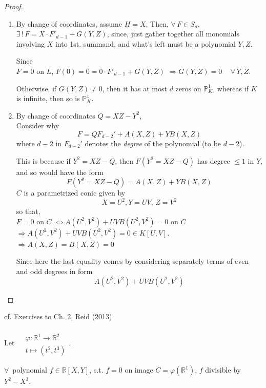 \begin{proof}
\begin{enumerate}
	\item[(i)] By change of coordinates, assume $H = X$, 
	Then, $\forall \, F \in S_d$, $\exists \, ! \, F = X \cdot F'_{d-1} + G(Y,Z)$, since, just gather together all monomials involving $X$ into 1st. summand, and what's left must be a polynomial $Y,Z$.
	
	Since \\
	$F = 0$ on $L$, $F(0) = 0 = 0 \cdot F'_{d-1} + G(Y,Z) $ $\Longrightarrow G(Y,Z) = 0\quad \, \forall \, Y,Z$. 
	
	Otherwise, if $G(Y,Z) \neq 0$, then it has at most $d$ zeros on $\mathbb{P}_K^1$, whereas if $K$ is infinite, then so is $\mathbb{P}_K^1$.  
	\item[(ii)] By change of coordinates $Q = XZ - Y^2$, \\ 
	Consider why 
	\[
	F = QF_{d-2}' + A(X,Z) + YB(X,Z)
	\]
	where $d-2$ in $F_{d-2}'$ denotes the \emph{degree} of the polynomial (to be $d-2$).
	
	This is because if $Y^2 = XZ - Q$, then $F(Y^2 = XZ - Q)$ has degree $\leq 1$ in $Y$, and so would have the form 
	\[
	F(Y^2 = XZ - Q) = A(X,Z) + YB(X,Z)
	\]
	$C$ is a parametrized conic given by 
	\[
	X = U^2 , Y = UV, \, Z = V^2
	\]
	so that, \\
	$F = 0$ on $C$ $\Longleftrightarrow  A(U^2, V^2) + UVB(U^2 , V^2) = 0$ on $C$ \\
	$\Longrightarrow A(U^2, V^2) + UVB(U^2 , V^2)  =0  \in K[U,V]$. \\
	$\Longrightarrow A(X,Z) = B(X,Z) =0 $
	
	Since here the last equality comes by considering separately terms of even and odd degrees in form 
	\[
	A(U^2, V^2)  + UVB(U^2, V^2)
	\]
	
\end{enumerate}	
\end{proof}

cf. Exercises to Ch. 2, Reid (2013)

Let $\begin{aligned} & \quad \\ 
& \varphi : \mathbb{R}^1 \to \mathbb{R}^2	\\
& t \mapsto (t^2, t^3) \end{aligned}$. 

$\forall \, $ polynomial $f \in \mathbb{R}[X, Y]$, s.t. $f= 0$ on image $C = \varphi(\mathbb{R}^1)$, $f$ divisible by $Y^2 - X^3$. 

